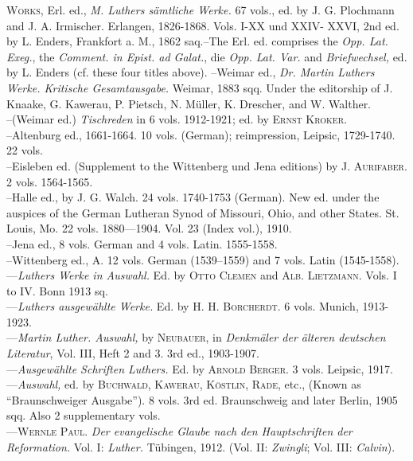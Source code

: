 \textsc{Works,} Erl. ed., \textit{M. Luthers sämtliche Werke.} 67 vols., ed. by J. G. Plochmann
and J. A. Irmischer. Erlangen, 1826-1868. Vols. I-XX und XXIV-
XXVI, 2nd ed. by L. Enders, Frankfort a. M., 1862 saq.--The Erl. ed.
comprises the \textit{Opp. Lat. Exeg.}, the \textit{Comment. in Epist. ad Galat.}, die \textit{Opp.
Lat. Var.} and \textit{Briefwechsel,} ed. by L. Enders (cf. these four titles above).
--Weimar ed., \textit{Dr. Martin Luthers Werke. Kritische Gesamtausgabe.} Weimar,
1883 sqq. Under the editorship of J. Knaake, G. Kawerau, P. Pietsch,
N. Müller, K. Drescher, and W. Walther. \\
--(Weimar ed.) \textit{Tischreden} in 6 vols. 1912-1921; ed. by \textsc{Ernst Kroker.} \\
--Altenburg ed., 1661-1664. 10 vols. (German); reimpression, Leipsic,
1729-1740. 22 vols. \\
--Eisleben ed. (Supplement to the Wittenberg und Jena editions) by \textsc{J.
Aurifaber.} 2 vols. 1564-1565. \\
--Halle ed., by J. G. Walch. 24 vols. 1740-1753 (German). New ed.
under the auspices of the German Lutheran Synod of Missouri, Ohio, and
other States. St. Louis, Mo. 22 vols. 1880---1904. Vol. 23 (Index vol.),
1910. \\
--Jena ed., 8 vols. German and 4 vols. Latin. 1555-1558. \\
--Wittenberg ed., A. 12 vols. German (1539--1559) and 7 vols. Latin
(1545-1558). \\
---\textit{Luthers Werke in Auswahl.} Ed. by \textsc{Otto Clemen} and \textsc{Alb. Lietzmann.}
Vols. I to IV. Bonn 1913 sq. \\
---\textit{Luthers ausgewählte Werke.} Ed. by \textsc{H. H. Borcherdt.} 6 vols. Munich,
1913-1923. \\
---\textit{Martin Luther. Auswahl,} by \textsc{Neubauer}, in \textit{Denkmäler der älteren
deutschen Literatur}, Vol. III, Heft 2 and 3. 3rd ed., 1903-1907. \\
---\textit{Ausgewählte Schriften Luthers.} Ed. by \textsc{Arnold Berger.} 3 vols. Leipsic,
1917. \\
---\textit{Auswahl,} ed. by \textsc{Buchwald, Kawerau, Köstlin, Rade,} etc., (Known
as “Braunschweiger Ausgabe”). 8 vols. 3rd ed. Braunschweig and later
Berlin, 1905 sqq. Also 2 supplementary vols. \\
---\textsc{Wernle Paul.} \textit{Der evangelische Glaube nach den Hauptschriften der Reformation.}
Vol. I: \textit{Luther.} Tübingen, 1912. (Vol. II: \textit{Zwingli}; Vol. III:
\textit{Calvin}).

